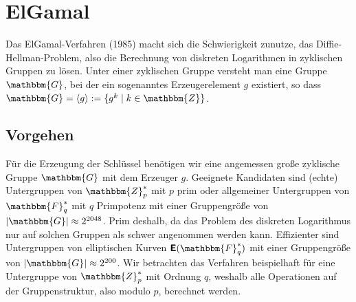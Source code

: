 \section{ElGamal}
\label{ch:asymenc:elgamal}
Das ElGamal-Verfahren (1985) macht sich die Schwierigkeit zunutze, das Diffie-Hellman-Problem, also die Berechnung von diskreten Logarithmen in zyklischen Gruppen zu lösen. Unter einer zyklischen Gruppe versteht man eine Gruppe $\mathbbm{G}$, bei der ein sogenanntes Erzeugerelement $g$ existiert, so dass $\mathbbm{G} = \langle g \rangle := \{g^k \mid k \in \mathbbm{Z}\}$.

\subsection{Vorgehen}
Für die Erzeugung der Schlüssel benötigen wir eine angemessen große zyklische Gruppe $\mathbbm{G}$ mit dem Erzeuger $g$.
Geeignete Kandidaten sind (echte) Untergruppen von $\mathbbm{Z}^*_p$ mit $p$ prim oder allgemeiner Untergruppen von $\mathbbm{F}^*_q$ mit $q$ Primpotenz mit einer Gruppengröße von $|\mathbbm{G}| \approx 2^{2048}$. Prim deshalb, da das Problem des diskreten Logarithmus nur auf solchen Gruppen als schwer angenommen werden kann.
Effizienter sind Untergruppen von elliptischen Kurven $\boldsymbol{\mathsf{E}}(\mathbbm{F}^*_q)$ mit einer Gruppengröße von $|\mathbbm{G}| \approx 2^{200}$. Wir betrachten das Verfahren beispielhaft für eine Untergruppe von $\mathbbm{Z}^*_p$ mit Ordnung $q$, weshalb alle Operationen auf der Gruppenstruktur, also modulo $p$, berechnet werden.

